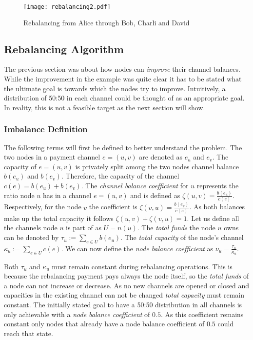 \documentclass[final]{fhnwreport}       %
\begin{document}
\begin{figure}[H]
\centering
\texttt{[image: rebalancing2.pdf]}
\caption{Rebalancing from Alice through Bob, Charli and David}
\label{fig:rebal2}
\end{figure}

\subsection{Rebalancing Algorithm}\label{subsec:rebal_algo}
The previous section was about how nodes can \emph{improve} their channel balances. While the improvement in the example was quite clear it has to be stated what the ultimate goal is towards which the nodes try to improve. Intuitively, a distribution of 50:50 in each channel could be thought of as an appropriate goal. In reality, this is not a feasible target as the next section will show.

\subsubsection{Imbalance Definition}
The following terms will first be defined to better understand the problem. The two nodes in a payment channel $e=(u,v)$ are denoted as $e_u$ and $e_v$. The capacity of $e=(u,v)$ is privately split among the two nodes channel balance $b(e_u)$ and $b(e_v)$. Therefore, the capacity of the channel $c(e)=b(e_u)+b(e_v)$. The \emph{channel balance coefficient } for $u$ represents the ratio node $u$ has in a channel $e=(u,v)$ and is defined as $\zeta{(u,v)}=\frac{b(e_u)}{c(e)}$. Respectively, for the node $v$ the coefficient is $\zeta{(v,u)}=\frac{b(e_v)}{c(e)}$. As both balances make up the total capacity it follows  $\zeta{(u,v)} + \zeta{(v,u)}=1$. Let us define all the channels node $u$ is part of as $U=n(u)$. The \emph{total funds} the node $u$ owns can be denoted by $\tau_u:=\displaystyle{\sum_{e\in U}b(e_u)}$. The \emph{total capacity} of the node's channel $\kappa_u:=\displaystyle{\sum_{e\in U}c(e)}$. We can now define the \emph{node balance coefficient} as $\nu_u = \frac{\tau_u}{\kappa_u}$.

Both $\tau_u$ and $\kappa_u$ must remain constant during rebalancing operations. This is because the rebalancing payment pays always the node itself, so the \emph{total funds} of a node can not increase or decrease. As no new channels are opened or closed and capacities in the existing channel can not be changed \emph{total capacity} must remain constant. The initially stated goal to have a 50:50 distribution in all channels is only achievable with a \emph{node balance coefficient} of $0.5$. As this coefficient remains constant only nodes that already have a node balance coefficient of $0.5$ could reach that state.
\end{document}
